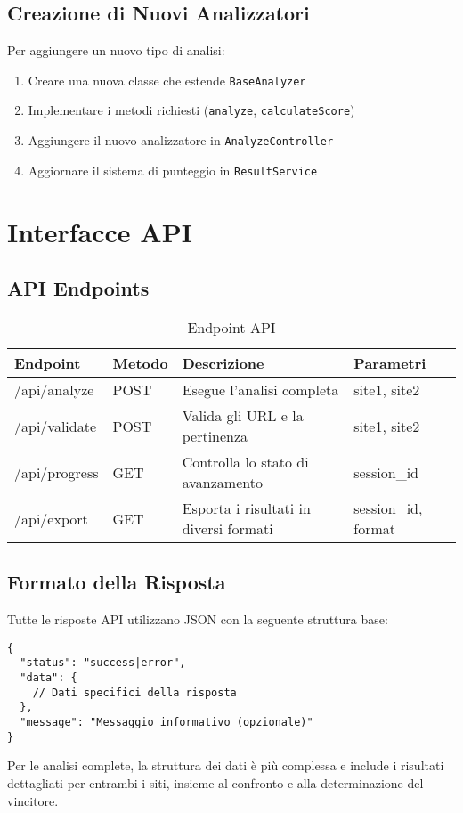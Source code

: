 \subsection{Creazione di Nuovi Analizzatori}
Per aggiungere un nuovo tipo di analisi:
\begin{enumerate}
    \item Creare una nuova classe che estende \texttt{BaseAnalyzer}
    \item Implementare i metodi richiesti (\texttt{analyze}, \texttt{calculateScore})
    \item Aggiungere il nuovo analizzatore in \texttt{AnalyzeController}
    \item Aggiornare il sistema di punteggio in \texttt{ResultService}
\end{enumerate}

\section{Interfacce API}

\subsection{API Endpoints}
\begin{table}[H]
\centering
\begin{tabular}{|l|l|l|l|}
\hline
\textbf{Endpoint} & \textbf{Metodo} & \textbf{Descrizione} & \textbf{Parametri} \\
\hline
/api/analyze & POST & Esegue l'analisi completa & site1, site2 \\
\hline
/api/validate & POST & Valida gli URL e la pertinenza & site1, site2 \\
\hline
/api/progress & GET & Controlla lo stato di avanzamento & session\_id \\
\hline
/api/export & GET & Esporta i risultati in diversi formati & session\_id, format \\
\hline
\end{tabular}
\caption{Endpoint API}
\label{table:api-endpoints}
\end{table}

\subsection{Formato della Risposta}
Tutte le risposte API utilizzano JSON con la seguente struttura base:

\begin{verbatim}
{
  "status": "success|error",
  "data": {
    // Dati specifici della risposta
  },
  "message": "Messaggio informativo (opzionale)"
}
\end{verbatim}

Per le analisi complete, la struttura dei dati è più complessa e include i risultati dettagliati per entrambi i siti, insieme al confronto e alla determinazione del vincitore.